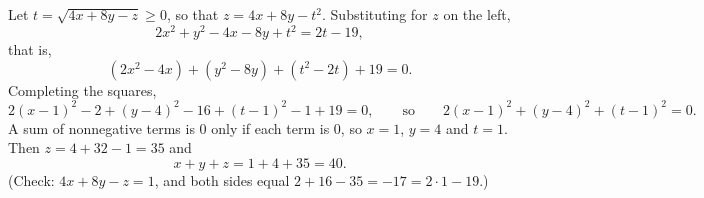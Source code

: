 Let $t=\sqrt{4x+8y-z}\ge0$, so that $z=4x+8y-t^2$. Substituting for $z$ on the left,
\[2x^2+y^2-4x-8y+t^2=2t-19,\]
that is,
\[\left(2x^2-4x\right)+\left(y^2-8y\right)+\left(t^2-2t\right)+19=0 .\]
Completing the squares,
\[2(x-1)^2-2+(y-4)^2-16+(t-1)^2-1+19=0,\qquad\text{so}\qquad 2(x-1)^2+(y-4)^2+(t-1)^2=0 .\]
A sum of nonnegative terms is $0$ only if each term is $0$, so $x=1$, $y=4$ and $t=1$. Then $z=4+32-1=35$ and
\[x+y+z=1+4+35=\boxed{40}.\]
(Check: $4x+8y-z=1$, and both sides equal $2+16-35=-17=2\cdot1-19$.)
